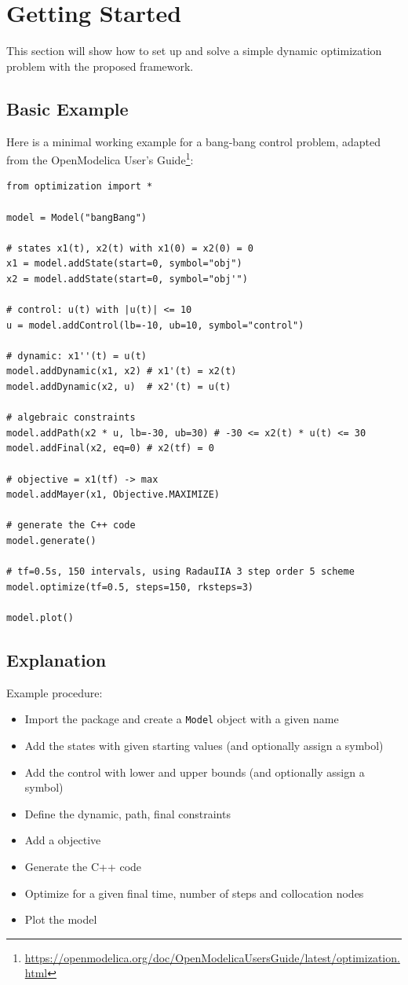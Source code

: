 \documentclass[12pt]{article}
\begin{document}
	\section{Getting Started}
	This section will show how to set up and solve a simple dynamic optimization problem with the proposed framework.
	
	\subsection{Basic Example}
	Here is a minimal working example for a bang-bang control problem, adapted from the OpenModelica User's Guide\footnote{\url{https://openmodelica.org/doc/OpenModelicaUsersGuide/latest/optimization.html}}:
	
	\begin{lstlisting}
from optimization import *

model = Model("bangBang")

# states x1(t), x2(t) with x1(0) = x2(0) = 0
x1 = model.addState(start=0, symbol="obj") 
x2 = model.addState(start=0, symbol="obj'")

# control: u(t) with |u(t)| <= 10
u = model.addControl(lb=-10, ub=10, symbol="control") 

# dynamic: x1''(t) = u(t)
model.addDynamic(x1, x2) # x1'(t) = x2(t)
model.addDynamic(x2, u)  # x2'(t) = u(t)

# algebraic constraints
model.addPath(x2 * u, lb=-30, ub=30) # -30 <= x2(t) * u(t) <= 30
model.addFinal(x2, eq=0) # x2(tf) = 0

# objective = x1(tf) -> max
model.addMayer(x1, Objective.MAXIMIZE) 

# generate the C++ code
model.generate() 

# tf=0.5s, 150 intervals, using RadauIIA 3 step order 5 scheme
model.optimize(tf=0.5, steps=150, rksteps=3)

model.plot()
	\end{lstlisting}

	\subsection{Explanation}
	Example procedure:
	\begin{itemize}
		\item Import the package and create a \texttt{Model} object with a given name
		\item Add the states with given starting values (and optionally assign a symbol)
		\item Add the control with lower and upper bounds (and optionally assign a symbol)
		\item Define the dynamic, path, final constraints
		\item Add a objective
		\item Generate the C++ code
		\item Optimize for a given final time, number of steps and collocation nodes
		\item Plot the model
	\end{itemize}
\end{document}

